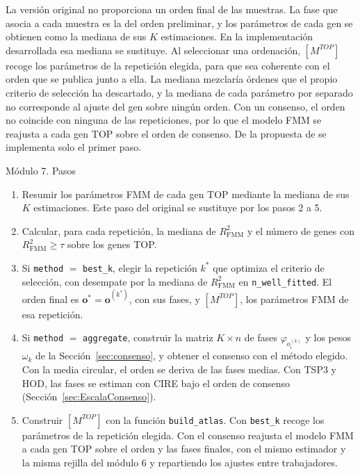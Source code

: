 \documentclass[12pt, a4paper]{report}
\newcommand{\nuevo}[1]{\textcolor{cnuevo}{#1}}
\newenvironment{pasos}{\begin{enumerate}[nosep,leftmargin=1.5em,label=\arabic*.]}{\end{enumerate}}
\begin{document}
La versión original no proporciona un orden final de las muestras. La fase que asocia a cada muestra es la del orden preliminar, y los parámetros de cada gen se obtienen como la mediana de sus \(K\) estimaciones. En la implementación desarrollada esa mediana se sustituye. Al seleccionar una ordenación, \([M^{TOP}]\) recoge los parámetros de la repetición elegida, para que sea coherente con el orden que se publica junto a ella. La mediana mezclaría órdenes que el propio criterio de selección ha descartado, y la mediana de cada parámetro por separado no corresponde al ajuste del gen sobre ningún orden. Con un consenso, el orden no coincide con ninguna de las repeticiones, por lo que el modelo FMM se reajusta a cada gen TOP sobre el orden de consenso. De la propuesta de \citet{barragan2015} se implementa solo el primer paso.

\begin{panel}{Módulo 7. Pasos}
\begin{pasos}
\item Resumir los parámetros FMM de cada gen TOP mediante la mediana de sus \(K\) estimaciones. \nuevo{Este paso del original se sustituye por los pasos 2 a 5.}
\item \nuevo{Calcular, para cada repetición, la mediana de \(R^2_{\mathrm{FMM}}\) y el número de genes con \(R^2_{\mathrm{FMM}}\geq\tau\) sobre los genes TOP.}
\item \nuevo{Si \texttt{method} \(=\) \texttt{best\_k}, elegir la repetición \(k^{*}\) que optimiza el criterio de selección, con desempate por la mediana de \(R^2_{\mathrm{FMM}}\) en \texttt{n\_well\_fitted}. El orden final es \(\mathbf{o}^{*}=\mathbf{o}^{(k^{*})}\), con sus fases, y \([M^{TOP}]\), los parámetros FMM de esa repetición.}
\item \nuevo{Si \texttt{method} \(=\) \texttt{aggregate}, construir la matriz \(K\times n\) de fases \(\varphi_{o_i^{(k)}}\) y los pesos \(\omega_k\) de la Sección~\ref{sec:consenso}, y obtener el consenso con el método elegido. Con la media circular, el orden se deriva de las fases medias. Con TSP3 y HOD, las fases se estiman con CIRE bajo el orden de consenso (Sección~\ref{sec:EscalaConsenso}).}
\item \nuevo{Construir \([M^{TOP}]\) con la función \texttt{build\_atlas}. Con \texttt{best\_k} recoge los parámetros de la repetición elegida. Con el consenso reajusta el modelo FMM a cada gen TOP sobre el orden y las fases finales, con el mismo estimador y la misma rejilla del módulo 6 y repartiendo los ajustes entre trabajadores.}
\end{pasos}
\end{panel}
\end{document}
